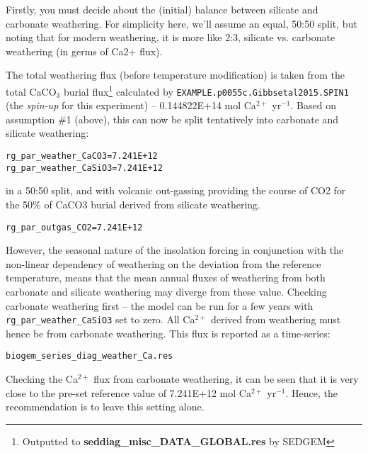 \documentclass[10pt,twoside]{article}
\begin{document}
\begin{compactenum}

                \item Firstly, you must decide about the (initial) balance between silicate and carbonate weathering. For simplicity here, we'll assume an equal, 50:50 split, but noting that for modern weathering, it is more like 2:3, silicate vs. carbonate weathering (in germs of Ca2+ flux).
                
                \item The total weathering flux (before temperature modification) is taken from the total CaCO$_{3}$ burial flux\footnote{Outputted to \textbf{seddiag\_misc\_DATA\_GLOBAL.res} by SEDGEM} calculated by \texttt{EXAMPLE.p0055c.Gibbsetal2015.SPIN1} (the \textit{spin-up} for this experiment) -- 0.144822E+14 mol Ca$^{2+}$ yr$^{-1}$.
                Based on assumption \#1 (above), this can now be split tentatively into carbonate and silicate weathering:
\vspace{-5pt}\begin{verbatim}
rg_par_weather_CaCO3=7.241E+12
rg_par_weather_CaSiO3=7.241E+12
                \end{verbatim}\vspace{-5pt}
                in a 50:50 split, and with volcanic out-gassing providing the course of CO2 for the 50\% of CaCO3 burial derived from silicate weathering.
\vspace{-5pt}\begin{verbatim}
rg_par_outgas_CO2=7.241E+12
                \end{verbatim}\vspace{-5pt}
                
                \item However, the seasonal nature of the insolation forcing in conjunction with the non-linear dependency of weathering on the deviation from the reference temperature, means that the mean annual fluxes of weathering from both carbonate and silicate weathering may diverge from these value.
                Checking carbonate weathering first -- the model can be run for a few years with \texttt{rg\_par\_weather\_CaSiO3} set to zero. All Ca$^{2+}$ derived from weathering must hence be from carbonate weathering. This flux is reported as a time-series:
\vspace{-5pt}\begin{verbatim}
biogem_series_diag_weather_Ca.res
\end{verbatim}\vspace{-5pt}
Checking the Ca$^{2+}$ flux from carbonate weathering, it can be seen that it is very close to the pre-set reference value of  7.241E+12 mol Ca$^{2+}$ yr$^{-1}$.
Hence, the recommendation is to leave this setting alone.
                

\end{compactenum}
\end{document}
